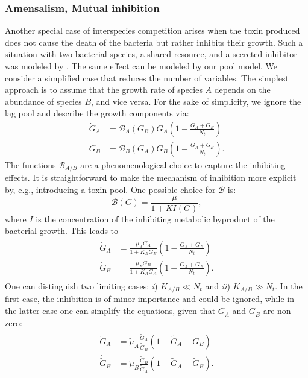 \documentclass[10pt,1p,authoryear]{elsarticle}
\numberwithin{equation}{section}
\begin{document}
\subsubsection{Amensalism, Mutual inhibition}
\label{section:inhibition}
Another special case of interspecies competition arises when the toxin produced does not cause the death of the bacteria but rather inhibits their growth.
Such a situation with two bacterial species, a shared resource, and a secreted inhibitor was modeled by \citet{lenski_coexistence_1986}.
The same effect can be modeled by our pool model.
We consider a simplified case that reduces the number of variables.
The simplest approach is to assume that the growth rate of species $A$ depends on the abundance of species $B$, and vice versa.
For the sake of simplicity, we ignore the lag pool and describe the growth components via:
\begin{align}
    \dot{G}_A &= \mathcal{B}_A(G_B)G_A\left(1 - \frac{G_A+G_B}{N_t}\right)\\
    \dot{G}_B &= \mathcal{B}_B(G_A) G_B\left(1-\frac{G_A+G_B}{N_t}\right).
\end{align}
The functions $\mathcal{B}_{A/B}$ are a phenomenological choice to capture the inhibiting effects.
It is straightforward to make the mechanism of inhibition more explicit by, e.g., introducing a toxin pool.
One possible choice for $\mathcal{B}$ is:
\begin{equation}
    \mathcal{B}(G) = \frac{\mu}{1+KI(G)},
\end{equation}
where $I$ is the concentration of the inhibiting metabolic byproduct of the bacterial growth.
This leads to
\begin{align}\begin{split}
    \dot{G}_A &= \frac{\mu_A G_A}{1+K_BG_B}\left(1 - \frac{G_A+G_B}{N_t}\right)\\
    \dot{G}_B &= \frac{\mu_B G_B}{1+K_AG_A}\left(1-\frac{G_A+G_B}{N_t}\right).
\end{split}\end{align}
One can distinguish two limiting cases: {\it i}) $K_{A/B}\ll N_t$ and {\it ii}) $K_{A/B}\gg N_t$.
In the first case, the inhibition is of minor importance and could be ignored, while in the latter case one can simplify the equations, given that $G_A$ and $G_B$ are non-zero:
\begin{align}\begin{split}
    \dot{\tilde{G}}_A &=\tilde{\mu}_A\frac{\tilde{G}_A}{\tilde{G}_B}\left(1 - \tilde{G}_A-\tilde{G}_B\right)\\
    \dot{\tilde{G}}_B &= \tilde{\mu}_B\frac{\tilde{G}_B}{\tilde{G}_A}\left(1 - \tilde{G}_A-\tilde{G}_B\right).
\end{split}\end{align}
\end{document}
